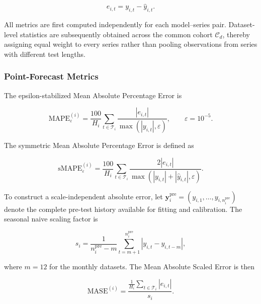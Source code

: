 \documentclass[review,number,sort&compress]{elsarticle}
\begin{document}
\begin{equation}
e_{i,t}
=
y_{i,t}-\widehat{y}_{i,t}.
\label{eq:forecast_error}
\end{equation}

All metrics are first computed independently for each model--series pair. Dataset-level statistics are subsequently obtained across the common cohort $\mathcal{C}_d$, thereby assigning equal weight to every series rather than pooling observations from series with different test lengths.

\subsubsection{Point-Forecast Metrics}

The epsilon-stabilized Mean Absolute Percentage Error is

\begin{equation}
\mathrm{MAPE}_{\varepsilon}^{(i)}
=
\frac{100}{H_i}
\sum_{t\in\mathcal{T}_i}
\frac{
    |e_{i,t}|
}{
    \max\left(|y_{i,t}|,\varepsilon\right)
},
\qquad
\varepsilon=10^{-5}.
\label{eq:mape_epsilon}
\end{equation}

The symmetric Mean Absolute Percentage Error is defined as

\begin{equation}
\mathrm{sMAPE}_{\varepsilon}^{(i)}
=
\frac{100}{H_i}
\sum_{t\in\mathcal{T}_i}
\frac{
    2|e_{i,t}|
}{
    \max\left(
        |y_{i,t}|+|\widehat{y}_{i,t}|,
        \varepsilon
    \right)
}.
\label{eq:smape}
\end{equation}

To construct a scale-independent absolute error, let
$\mathbf{y}_{i}^{\mathrm{pre}}=
(y_{i,1},\ldots,y_{i,n_i^{\mathrm{pre}}})$
denote the complete pre-test history available for fitting and calibration. The seasonal naive scaling factor is

\begin{equation}
s_i
=
\frac{1}{
    n_i^{\mathrm{pre}}-m
}
\sum_{t=m+1}^{n_i^{\mathrm{pre}}}
\left|
    y_{i,t}-y_{i,t-m}
\right|,
\label{eq:seasonal_naive_scale}
\end{equation}

where $m=12$ for the monthly datasets. The Mean Absolute Scaled Error is then

\begin{equation}
\mathrm{MASE}^{(i)}
=
\frac{
    \displaystyle
    \frac{1}{H_i}
    \sum_{t\in\mathcal{T}_i}|e_{i,t}|
}{
    s_i
}.
\label{eq:mase}
\end{equation}
\end{document}
